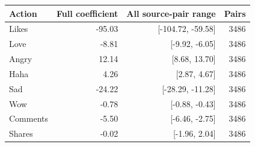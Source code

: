 \begin{tabular}{lrrr}
\toprule
Action & Full coefficient & All source-pair range & Pairs \\
\midrule
Likes & -95.03 & [-104.72, -59.58] & 3486 \\
Love & -8.81 & [-9.92, -6.05] & 3486 \\
Angry & 12.14 & [8.68, 13.70] & 3486 \\
Haha & 4.26 & [2.87, 4.67] & 3486 \\
Sad & -24.22 & [-28.29, -11.28] & 3486 \\
Wow & -0.78 & [-0.88, -0.43] & 3486 \\
Comments & -5.50 & [-6.46, -2.75] & 3486 \\
Shares & -0.02 & [-1.96, 2.04] & 3486 \\
\bottomrule
\end{tabular}
